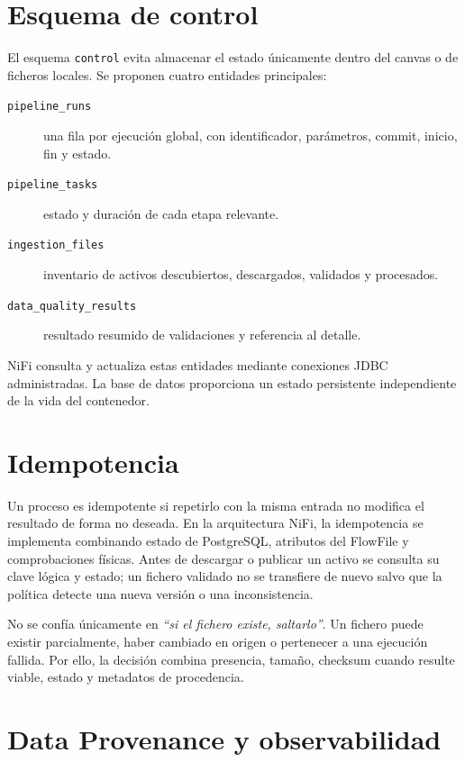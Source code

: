 \section{Esquema de control}

El esquema \texttt{control} evita almacenar el estado únicamente dentro del canvas o de ficheros locales. Se proponen cuatro entidades principales:

\begin{description}
\item[\texttt{pipeline\_runs}] una fila por ejecución global, con identificador, parámetros, commit, inicio, fin y estado.
\item[\texttt{pipeline\_tasks}] estado y duración de cada etapa relevante.
\item[\texttt{ingestion\_files}] inventario de activos descubiertos, descargados, validados y procesados.
\item[\texttt{data\_quality\_results}] resultado resumido de validaciones y referencia al detalle.
\end{description}

NiFi consulta y actualiza estas entidades mediante conexiones JDBC administradas. La base de datos proporciona un estado persistente independiente de la vida del contenedor.

\section{Idempotencia}

Un proceso es idempotente si repetirlo con la misma entrada no modifica el resultado de forma no deseada. En la arquitectura NiFi, la idempotencia se implementa combinando estado de PostgreSQL, atributos del FlowFile y comprobaciones físicas. Antes de descargar o publicar un activo se consulta su clave lógica y estado; un fichero validado no se transfiere de nuevo salvo que la política detecte una nueva versión o una inconsistencia.

No se confía únicamente en \textit{``si el fichero existe, saltarlo''}. Un fichero puede existir parcialmente, haber cambiado en origen o pertenecer a una ejecución fallida. Por ello, la decisión combina presencia, tamaño, checksum cuando resulte viable, estado y metadatos de procedencia.

\section{Data Provenance y observabilidad}

